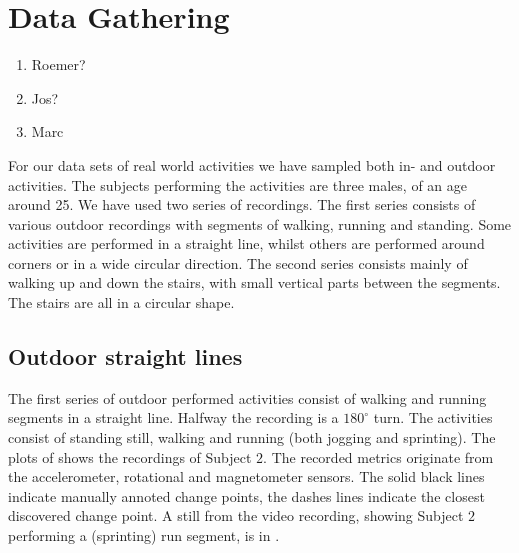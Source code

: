 \section{Data Gathering}\label{sec:data_gathering}
\begin{enumerate}
  \item Roemer?
  \item Jos?
  \item Marc
\end{enumerate}
For our data sets of real world activities we have sampled both in- and outdoor activities.
The subjects performing the activities are three males, of an age around 25.
We have used two series of recordings.
The first series consists of various outdoor recordings with segments of walking, running and standing.
Some activities are performed in a straight line, whilst others are performed around corners or in a wide circular direction.
The second series consists mainly of walking up and down the stairs, with small vertical parts between the segments.
The stairs are all in a circular shape.

\subsection{Outdoor straight lines}\label{subsec:outdoor_straight}
The first series of outdoor performed activities consist of walking and running segments in a straight line.
Halfway the recording is a $180^{\circ}$ turn.
The activities consist of standing still, walking and running (both jogging and sprinting).
The plots of  shows the recordings of Subject $2$.
The recorded metrics originate from the accelerometer, rotational and magnetometer sensors.
The solid black lines indicate manually annoted change points, the dashes lines indicate the closest discovered change point.
A still from the video recording, showing Subject $2$ performing a (sprinting) run segment, is in .


